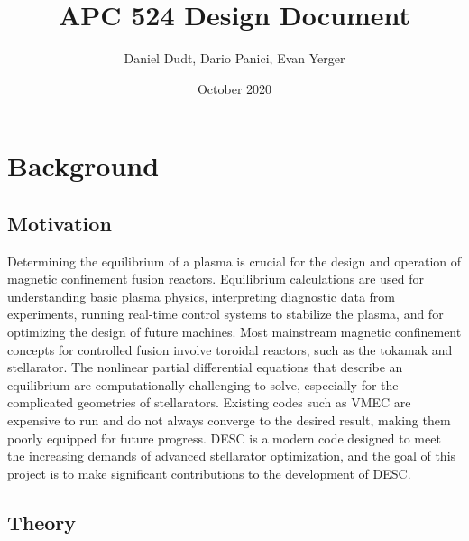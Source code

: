 \documentclass{article}
\title{APC 524 Design Document}
\author{Daniel Dudt, Dario Panici, Evan Yerger}
\date{October 2020}
\begin{document}
\maketitle

\section{Background}

\subsection{Motivation}

Determining the equilibrium of a plasma is crucial for the design and operation of magnetic confinement fusion reactors.
Equilibrium calculations are used for understanding basic plasma physics, interpreting diagnostic data from experiments, running real-time control systems to stabilize the plasma, and for optimizing the design of future machines.
Most mainstream magnetic confinement concepts for controlled fusion involve toroidal reactors, such as the tokamak and stellarator.
The nonlinear partial differential equations that describe an equilibrium are computationally challenging to solve, especially for the complicated geometries of stellarators.
Existing codes such as VMEC \cite{Hirshman1983} are expensive to run and do not always converge to the desired result, making them poorly equipped for future progress.
DESC \cite{Dudt2020} is a modern code designed to meet the increasing demands of advanced stellarator optimization, and the goal of this project is to make significant contributions to the development of DESC.

\subsection{Theory}
\end{document}
